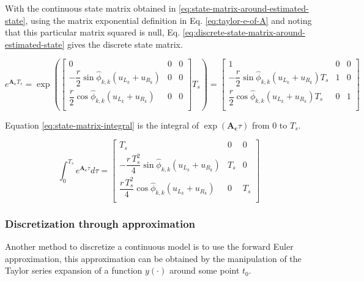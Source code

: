 \documentclass[12pt]{article}
\begin{document}
With the continuous state matrix obtained in \ref{eq:state-matrix-around-estimated-state}, using the matrix exponential definition in Eq. \ref{eq:taylor-e-of-A} and noting that this particular matrix squared is null, Eq. \ref{eq:discrete-state-matrix-around-estimated-state} gives the discrete state matrix.

\begin{equation}
    e^{\mathbf{A_c} T_s} = \exp\left(\begin{bmatrix}
        0 & 0 & 0\\
        -\dfrac{r}{2}\sin\hat{\phi}_{k,k} (u_{L_k} + u_{R_k}) & 0 & 0\\
        \dfrac{r}{2}\cos\hat{\phi}_{k,k} (u_{L_k} + u_{R_k}) & 0 & 0\\
    \end{bmatrix} T_s\right) = \begin{bmatrix}
        1 & 0 & 0\\
        -\dfrac{r}{2}\sin\hat{\phi}_{k,k} (u_{L_k} + u_{R_k}) T_s & 1 & 0\\
        \dfrac{r}{2}\cos\hat{\phi}_{k,k} (u_{L_k} + u_{R_k}) T_s & 0 & 1\\
    \end{bmatrix}
    \label{eq:discrete-state-matrix-around-estimated-state}
\end{equation}

Equation \ref{eq:state-matrix-integral} is the integral of $\exp\left(\mathbf{A_c}\tau\right)$ from 0 to $T_s$.

\begin{equation}
    \int_{0}^{T_s} e^{\mathbf{A_c}\tau} d\tau  = \begin{bmatrix}
        T_s & 0 & 0\\
        -\dfrac{r\, T_s^2}{4}\sin\hat{\phi}_{k,k} (u_{L_k} + u_{R_k}) & T_s & 0\\
        \dfrac{r\, T_s^2}{4}\cos\hat{\phi}_{k,k} (u_{L_k} + u_{R_k}) & 0 & T_s\\
    \end{bmatrix}
    \label{eq:state-matrix-integral}
\end{equation}
\renewcommand{\arraystretch}{1}

\subsubsection{Discretization through approximation}
Another method to discretize a continuous model is to use the forward Euler approximation, this approximation can be obtained by the manipulation of the Taylor series expansion of a function $y(\cdot)$ around some point $t_0$.
\end{document}

